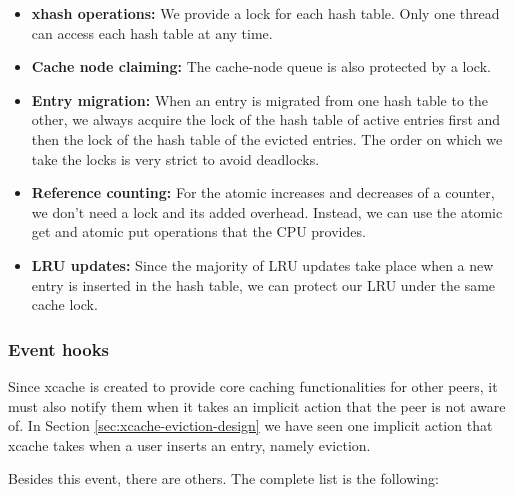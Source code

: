 \begin{itemize}
	\item
		\textbf{xhash operations:} We provide a lock for each hash 
		table. Only one thread can access each hash table at any time.
	\item
		\textbf{Cache node claiming:} The cache-node queue is also 
		protected by a lock.
	\item
		\textbf{Entry migration:} When an entry is migrated from one 
		hash table to the other, we always acquire the lock of the hash 
		table of active entries first and then the lock of the hash 
		table of the evicted entries. The order on which we take the 
		locks is very strict to avoid deadlocks.
	\item
		\textbf{Reference counting:} For the atomic increases and 
		decreases of a counter, we don't need a lock and its added 
		overhead. Instead, we can use the atomic get and atomic put 
		operations that the CPU provides.
	\item
		\textbf{LRU updates:} Since the majority of LRU updates take
		place when a new entry is inserted in the hash table, we can 
		protect our LRU under the same cache lock.
\end{itemize}

\subsubsection{Event hooks}\label{sec:xcache-hooks-design}

Since xcache is created to provide core caching functionalities for other 
peers, it must also notify them when it takes an implicit action that the peer 
is not aware of. In Section \ref{sec:xcache-eviction-design} we have seen one 
implicit action that xcache takes when a user inserts an entry, namely 
eviction. 

Besides this event, there are others. The complete list is the following:

